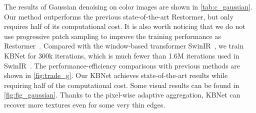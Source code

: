 \documentclass[default,iicol]{sn-jnl}
\theoremstyle{thmstyleone}\newtheorem{theorem}{Theorem}\newtheorem{proposition}[theorem]{Proposition}
\theoremstyle{thmstyletwo}\newtheorem{example}{Example}\newtheorem{remark}{Remark}
\theoremstyle{thmstylethree}\newtheorem{definition}{Definition}
\begin{document}
The results of Gaussian denoising on color images are shown in \cref{tab:c_gaussian}. 
Our method outperforms the previous state-of-the-art Restormer, but only requires half of its computational cost. 
It is also worth noticing that we do not use progressive patch sampling to improve the training performance as Restormer~\cite{restormer}. 
Compared with the window-based transformer SwinIR~\cite{liang2021swinir}, we train KBNet for 300k iterations, which is much fewer than 1.6M iterations used in SwinIR~\cite{liang2021swinir}.
The performance-efficiency comparisons with previous methods are shown in \cref{fig:trade_g}. Our KBNet achieves state-of-the-art results while requiring half of the computational cost.
Some visual results can be found in \cref{fig:fig_gaussian}. Thanks to the pixel-wise adaptive aggregation, KBNet can recover more textures even for some very thin edges.
\end{document}
